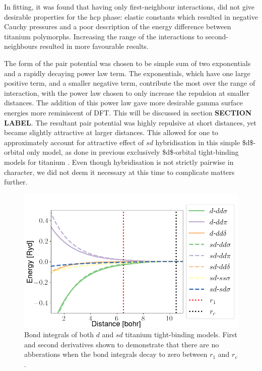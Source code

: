 \documentclass[a4paper,12pt,oneside,print,numbered,index,PageStyleIII]{PhDThesisPSnPDF}
\begin{document}
In fitting, it was found that having only first-neighbour
interactions, did not give desirable properties for the hcp phase:
elastic constants which resulted in negative Cauchy pressures and a
poor description of the energy difference between titanium
polymorphs. Increasing the range of the interactions to
second-neighbours resulted in more favourable results.


The form of the pair potential was chosen to be simple sum of two
exponentials and a rapidly decaying power law term. The exponentials,
which have one large positive term, and a smaller negative term,
contribute the most over the range of interaction, with the power
law chosen to only increase the repulsion at smaller distances. The
addition of this power law gave more desirable gamma surface
energies more reminiscent of DFT. This will be discussed in section
\textbf{SECTION LABEL}. The resultant pair potential was highly repulsive
at short distances, yet became slightly
attractive at larger distances. This allowed for one to
approximately account for attractive effect of \(sd\) hybridisation
in this simple \$d\$-orbital only model, as done
in previous exclusively \$d\$-orbital tight-binding models for
titanium \cite{Girshick1998a}. Even though hybridisation is
not strictly pairwise in character, we did not deem it necessary at
this time to complicate matters further.


\begin{figure}[H]
  \begin{center}
    \includegraphics[width=\textwidth]{pictures/sd-d_bond_integrals_together.png}
    \caption[Bond integrals of both $d$ and $sd$ titanium tight-binding models.] {Bond integrals of both $d$ and $sd$ titanium tight-binding models. First and second derivatives shown to demonstrate that there are no abberations when the bond integrals decay to zero between $r_1$ and $r_c$.} %
    \label{fig:d_sd_bond_integrals}
  \end{center}
\end{figure}
\end{document}
